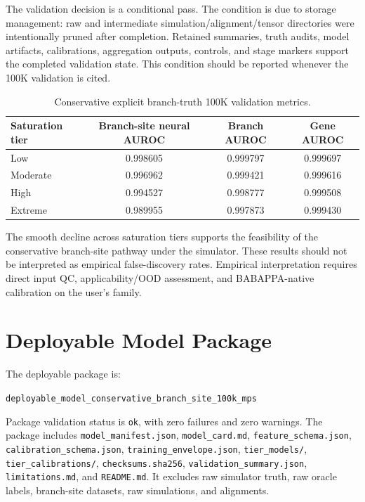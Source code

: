\documentclass[11pt,a4paper]{article}
\begin{document}
The validation decision is a conditional pass. The condition is due to storage management: raw and intermediate simulation/alignment/tensor directories were intentionally pruned after completion. Retained summaries, truth audits, model artifacts, calibrations, aggregation outputs, controls, and stage markers support the completed validation state. This condition should be reported whenever the 100K validation is cited.

\begin{longtable}{lccc}
\caption{Conservative explicit branch-truth 100K validation metrics.}
\label{tab:100k_metrics}\\
\toprule
\textbf{Saturation tier} & \textbf{Branch-site neural AUROC} & \textbf{Branch AUROC} & \textbf{Gene AUROC} \\
\midrule
Low & 0.998605 & 0.999797 & 0.999697 \\
Moderate & 0.996962 & 0.999421 & 0.999616 \\
High & 0.994527 & 0.998777 & 0.999508 \\
Extreme & 0.989955 & 0.997873 & 0.999430 \\
\bottomrule
\end{longtable}

The smooth decline across saturation tiers supports the feasibility of the conservative branch-site pathway under the simulator. These results should not be interpreted as empirical false-discovery rates. Empirical interpretation requires direct input QC, applicability/OOD assessment, and BABAPPA-native calibration on the user's family.

\section{Deployable Model Package}

The deployable package is:

\begin{center}
\texttt{deployable\_model\_conservative\_branch\_site\_100k\_mps}
\end{center}

Package validation status is \texttt{ok}, with zero failures and zero warnings. The package includes \texttt{model\_manifest.json}, \texttt{model\_card.md}, \texttt{feature\_schema.json}, \texttt{calibration\_schema.json}, \texttt{training\_envelope.json}, \texttt{tier\_models/}, \texttt{tier\_calibrations/}, \texttt{checksums.sha256}, \texttt{validation\_summary.json}, \texttt{limitations.md}, and \texttt{README.md}. It excludes raw simulator truth, raw oracle labels, branch-site datasets, raw simulations, and alignments.
\end{document}
